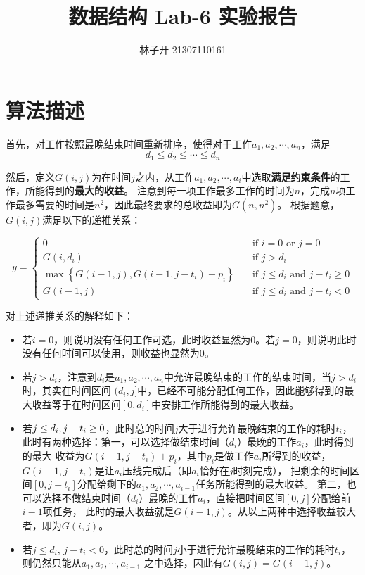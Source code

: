 \documentclass{article}
\title{数据结构 Lab-6 实验报告}
\author{林子开 21307110161}
\begin{document}
	\maketitle
	\tableofcontents

\section{算法描述}

首先，对工作按照最晚结束时间重新排序，使得对于工作$a_1,a_2,\cdots,a_n$，满足
\[d_1 \le d_2 \le \cdots \le d_n\]

然后，定义$G(i,j)$为在时间$j$之内，从工作$a_1,a_2,\cdots,a_i$中选取\textbf{满足约束条件}的工作，所能得到的\textbf{最大的收益}。
注意到每一项工作最多工作的时间为$n$，完成$n$项工作最多需要的时间是$n^2$，因此最终要求的总收益即为$G(n,n^2)$。
根据题意，$G(i,j)$满足以下的递推关系：

   \[ y=
    \begin{cases}
        0 & \quad \text{if } i=0 \text{ or } j=0 \\
        G(i,d_i) &\quad  \text{if } j>d_i \\
        \mathop{\max}\left\{ G(i-1,j), G(i-1,j-t_i)+p_i \right\} & \quad \text{if } j\le d_i \text{ and } j-t_i \ge 0 \\
        G(i-1,j) & \quad \text{if } j\le d_i \text{ and } j-t_i < 0 
    \end{cases} \]

对上述递推关系的解释如下：

\begin{itemize}

\item 若$i=0$，则说明没有任何工作可选，此时收益显然为0。若$j=0$，则说明此时没有任何时间可以使用，则收益也显然为0。

\item 若$j>d_i$，注意到$d_i$是$a_1,a_2,\cdots,a_n$中允许最晚结束的工作的结束时间，当$j>d_i$时，其实在时间区间
$(d_i,j]$中，已经不可能分配任何工作，因此能够得到的最大收益等于在时间区间$[0,d_i]$中安排工作所能得到的最大收益。

\item 若$j\le d_i \text,\, j-t_i \ge 0$，此时总的时间$j$大于进行允许最晚结束的工作的耗时$t_i$，
此时有两种选择：第一，可以选择做结束时间（$d_i$）最晚的工作$a_i$，此时得到的最大
收益为$G(i-1,j-t_i)+p_i$，其中$p_i$是做工作$a_i$所得到的收益，$G(i-1,j-t_i)$是让$a_i$压线完成后（即$a_i$恰好在$j$时刻完成），
把剩余的时间区间$[0,j-t_i]$分配给剩下的$a_1,a_2,\cdots,a_{i-1}$任务所能得到的最大收益。
第二，也可以选择不做结束时间（$d_i$）最晚的工作$a_i$，直接把时间区间$[0,j]$分配给前$i-1$项任务，
此时的最大收益就是$G(i-1,j)$。从以上两种中选择收益较大者，即为$G(i,j)$。

\item 若$j\le d_i,\, j-t_i < 0 $，此时总的时间$j$小于进行允许最晚结束的工作的耗时$t_i$，则仍然只能从$a_1,a_2,\cdots,a_{i-1}$
之中选择，因此有$G(i,j)=G(i-1,j)$。

\end{itemize}
\end{document}
